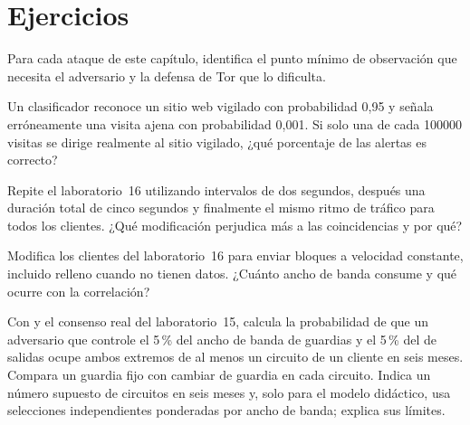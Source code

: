 \section*{Ejercicios}

\begin{esercizio}[1]\label{es:26-posizione}
Para cada ataque de este capítulo, identifica el punto mínimo de observación que necesita el adversario y la defensa de Tor que lo dificulta.
\end{esercizio}

\begin{esercizio}[1]\label{es:26-base}
Un clasificador reconoce un sitio web vigilado con probabilidad 0,95 y señala erróneamente una visita ajena con probabilidad 0,001. Si solo una de cada \num{100000} visitas se dirige realmente al sitio vigilado, ¿qué porcentaje de las alertas es correcto?
\end{esercizio}

\begin{esercizio}[2]\label{es:26-bin}
Repite el laboratorio~16 utilizando intervalos de dos segundos, después una duración total de cinco segundos y finalmente el mismo ritmo de tráfico para todos los clientes. ¿Qué modificación perjudica más a las coincidencias y por qué?
\end{esercizio}

\begin{esercizio}[2]\label{es:26-difesa}
Modifica los clientes del laboratorio~16 para enviar bloques a velocidad constante, incluido relleno cuando no tienen datos. ¿Cuánto ancho de banda consume y qué ocurre con la correlación?
\end{esercizio}

\begin{esercizio}[3]\label{es:26-probabilita}
Con  y el consenso real del laboratorio~15, calcula la probabilidad de que un adversario que controle el 5\,\% del ancho de banda de guardias y el 5\,\% del de salidas ocupe ambos extremos de al menos un circuito de un cliente en seis meses. Compara un guardia fijo con cambiar de guardia en cada circuito. Indica un número supuesto de circuitos en seis meses y, solo para el modelo didáctico, usa selecciones independientes ponderadas por ancho de banda; explica sus límites.
\end{esercizio}

